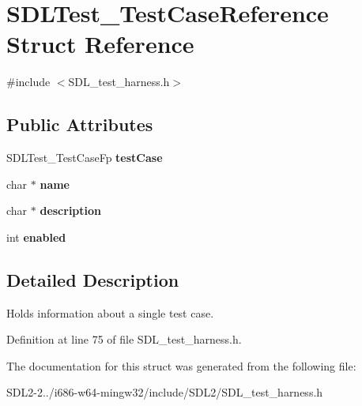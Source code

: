 \hypertarget{structSDLTest__TestCaseReference}{\section{S\+D\+L\+Test\+\_\+\+Test\+Case\+Reference Struct Reference}
\label{structSDLTest__TestCaseReference}
}


{\ttfamily \#include $<$S\+D\+L\+\_\+test\+\_\+harness.\+h$>$}

\subsection*{Public Attributes}
\begin{DoxyCompactItemize}
\item 
\hypertarget{structSDLTest__TestCaseReference_af9472f0c421a2845b540fc28fb30a3ef}{S\+D\+L\+Test\+\_\+\+Test\+Case\+Fp {\bfseries test\+Case}}\label{structSDLTest__TestCaseReference_af9472f0c421a2845b540fc28fb30a3ef}

\item 
\hypertarget{structSDLTest__TestCaseReference_ac6d004918bd034e56d041276d39186a6}{char $\ast$ {\bfseries name}}\label{structSDLTest__TestCaseReference_ac6d004918bd034e56d041276d39186a6}

\item 
\hypertarget{structSDLTest__TestCaseReference_a74caca873e1f894c067e7202b5c84eab}{char $\ast$ {\bfseries description}}\label{structSDLTest__TestCaseReference_a74caca873e1f894c067e7202b5c84eab}

\item 
\hypertarget{structSDLTest__TestCaseReference_a15168c85e38cae7557b4beb477ef6f9a}{int {\bfseries enabled}}\label{structSDLTest__TestCaseReference_a15168c85e38cae7557b4beb477ef6f9a}

\end{DoxyCompactItemize}


\subsection{Detailed Description}
Holds information about a single test case. 

Definition at line 75 of file S\+D\+L\+\_\+test\+\_\+harness.\+h.



The documentation for this struct was generated from the following file\+:\begin{DoxyCompactItemize}
\item 
S\+D\+L2-\/2../i686-\/w64-\/mingw32/include/\+S\+D\+L2/S\+D\+L\+\_\+test\+\_\+harness.\+h\end{DoxyCompactItemize}
